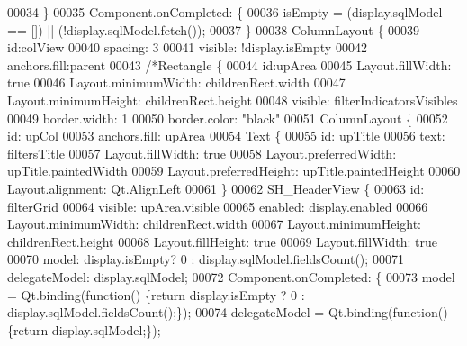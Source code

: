 \begin{DoxyCode}
00034     \}
00035     Component.onCompleted: \{
00036         isEmpty = (display.sqlModel == []) || (!display.sqlModel.fetch());
00037     \}
00038     ColumnLayout \{
00039         \textcolor{keywordtype}{id}:colView
00040         spacing: 3
00041         visible: !display.isEmpty
00042         anchors.fill:parent
00043         \textcolor{comment}{/*Rectangle \{}
00044 \textcolor{comment}{            id:upArea}
00045 \textcolor{comment}{            Layout.fillWidth: true}
00046 \textcolor{comment}{            Layout.minimumWidth: childrenRect.width}
00047 \textcolor{comment}{            Layout.minimumHeight: childrenRect.height}
00048 \textcolor{comment}{            visible: filterIndicatorsVisibles}
00049 \textcolor{comment}{            border.width: 1}
00050 \textcolor{comment}{            border.color: "black"}
00051 \textcolor{comment}{            ColumnLayout \{}
00052 \textcolor{comment}{                id: upCol}
00053 \textcolor{comment}{                anchors.fill: upArea}
00054 \textcolor{comment}{                Text \{}
00055 \textcolor{comment}{                    id: upTitle}
00056 \textcolor{comment}{                    text: filtersTitle}
00057 \textcolor{comment}{                    Layout.fillWidth: true}
00058 \textcolor{comment}{                    Layout.preferredWidth: upTitle.paintedWidth}
00059 \textcolor{comment}{                    Layout.preferredHeight: upTitle.paintedHeight}
00060 \textcolor{comment}{                    Layout.alignment: Qt.AlignLeft}
00061 \textcolor{comment}{                \}}
00062 \textcolor{comment}{                SH\_HeaderView \{}
00063 \textcolor{comment}{                    id: filterGrid}
00064 \textcolor{comment}{                    visible: upArea.visible}
00065 \textcolor{comment}{                    enabled: display.enabled}
00066 \textcolor{comment}{                    Layout.minimumWidth: childrenRect.width}
00067 \textcolor{comment}{                    Layout.minimumHeight: childrenRect.height}
00068 \textcolor{comment}{                    Layout.fillHeight: true}
00069 \textcolor{comment}{                    Layout.fillWidth: true}
00070 \textcolor{comment}{                    model: display.isEmpty? 0 : display.sqlModel.fieldsCount();}
00071 \textcolor{comment}{                    delegateModel: display.sqlModel;}
00072 \textcolor{comment}{                    Component.onCompleted: \{}
00073 \textcolor{comment}{                        model = Qt.binding(function() \{return display.isEmpty ? 0 :
       display.sqlModel.fieldsCount();\});}
00074 \textcolor{comment}{                        delegateModel = Qt.binding(function() \{return display.sqlModel;\});}

\end{DoxyCode}
